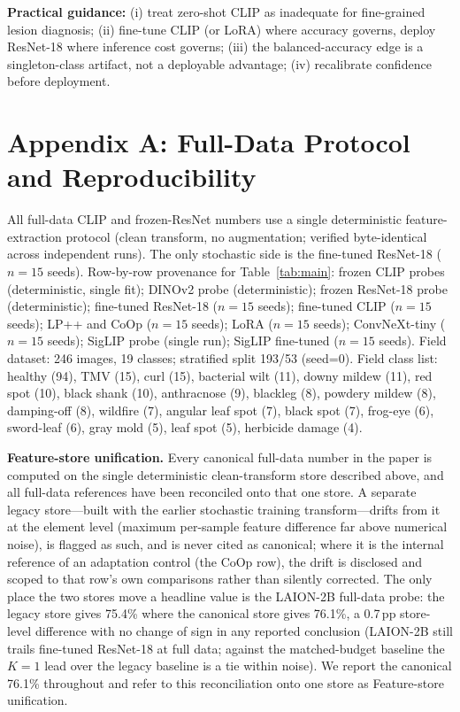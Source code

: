 \documentclass[10pt,a4paper]{article}
\begin{document}
\textbf{Practical guidance:} (i) treat zero-shot CLIP as inadequate for fine-grained lesion diagnosis; (ii) fine-tune CLIP (or LoRA) where accuracy governs, deploy ResNet-18 where inference cost governs; (iii) the balanced-accuracy edge is a singleton-class artifact, not a deployable advantage; (iv) recalibrate confidence before deployment.

\section*{Appendix A: Full-Data Protocol and Reproducibility}
\label{appx:protocol}

All full-data CLIP and frozen-ResNet numbers use a single deterministic feature-extraction protocol (clean transform, no augmentation; verified byte-identical across independent runs). The only stochastic side is the fine-tuned ResNet-18 ($n{=}15$ seeds). Row-by-row provenance for Table~\ref{tab:main}: frozen CLIP probes (deterministic, single fit); DINOv2 probe (deterministic); frozen ResNet-18 probe (deterministic); fine-tuned ResNet-18 ($n{=}15$ seeds); fine-tuned CLIP ($n{=}15$ seeds); LP++ and CoOp ($n{=}15$ seeds); LoRA ($n{=}15$ seeds); ConvNeXt-tiny ($n{=}15$ seeds); SigLIP probe (single run); SigLIP fine-tuned ($n{=}15$ seeds). Field dataset: 246 images, 19 classes; stratified split 193/53 (seed=0). Field class list: healthy (94), TMV (15), curl (15), bacterial wilt (11), downy mildew (11), red spot (10), black shank (10), anthracnose (9), blackleg (8), powdery mildew (8), damping-off (8), wildfire (7), angular leaf spot (7), black spot (7), frog-eye (6), sword-leaf (6), gray mold (5), leaf spot (5), herbicide damage (4).

\textbf{Feature-store unification.} Every canonical full-data number in the paper is computed on the single deterministic clean-transform store described above, and all full-data references have been reconciled onto that one store. A separate legacy store---built with the earlier stochastic training transform---drifts from it at the element level (maximum per-sample feature difference far above numerical noise), is flagged as such, and is never cited as canonical; where it is the internal reference of an adaptation control (the CoOp row), the drift is disclosed and scoped to that row's own comparisons rather than silently corrected. The only place the two stores move a headline value is the LAION-2B full-data probe: the legacy store gives 75.4\% where the canonical store gives 76.1\%, a 0.7\,pp store-level difference with no change of sign in any reported conclusion (LAION-2B still trails fine-tuned ResNet-18 at full data; against the matched-budget baseline the $K{=}1$ lead over the legacy baseline is a tie within noise). We report the canonical 76.1\% throughout and refer to this reconciliation onto one store as Feature-store unification.
\end{document}
